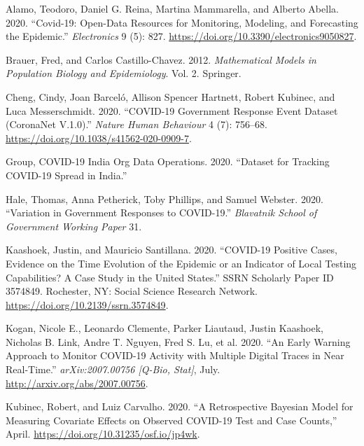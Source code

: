 \documentclass[10pt,letterpaper]{article}
\newlength{\cslhangindent}
\newenvironment{cslreferences}%
  {\setlength{\parindent}{0pt}%
  \everypar{\setlength{\hangindent}{\cslhangindent}}\ignorespaces}%
  {\par}
\begin{document}
\hypertarget{refs}{}
\begin{cslreferences}
\leavevmode\hypertarget{ref-alamoCovid19OpenDataResources2020}{}%
Alamo, Teodoro, Daniel G. Reina, Martina Mammarella, and Alberto Abella.
2020. ``Covid-19: Open-Data Resources for Monitoring, Modeling, and
Forecasting the Epidemic.'' \emph{Electronics} 9 (5): 827.
\url{https://doi.org/10.3390/electronics9050827}.

\leavevmode\hypertarget{ref-brauerMathematicalModelsPopulation2012}{}%
Brauer, Fred, and Carlos Castillo-Chavez. 2012. \emph{Mathematical
Models in Population Biology and Epidemiology}. Vol. 2. Springer.

\leavevmode\hypertarget{ref-chengCOVID19GovernmentResponse2020a}{}%
Cheng, Cindy, Joan Barceló, Allison Spencer Hartnett, Robert Kubinec,
and Luca Messerschmidt. 2020. ``COVID-19 Government Response Event
Dataset (CoronaNet V.1.0).'' \emph{Nature Human Behaviour} 4 (7):
756--68. \url{https://doi.org/10.1038/s41562-020-0909-7}.

\leavevmode\hypertarget{ref-covid19indiaorg2020tracker}{}%
Group, COVID-19 India Org Data Operations. 2020. ``Dataset for Tracking
COVID-19 Spread in India.''

\leavevmode\hypertarget{ref-haleVariationGovernmentResponses2020}{}%
Hale, Thomas, Anna Petherick, Toby Phillips, and Samuel Webster. 2020.
``Variation in Government Responses to COVID-19.'' \emph{Blavatnik
School of Government Working Paper} 31.

\leavevmode\hypertarget{ref-kaashoekCOVID19PositiveCases2020a}{}%
Kaashoek, Justin, and Mauricio Santillana. 2020. ``COVID-19 Positive
Cases, Evidence on the Time Evolution of the Epidemic or an Indicator of
Local Testing Capabilities? A Case Study in the United States.'' SSRN
Scholarly Paper ID 3574849. Rochester, NY: Social Science Research
Network. \url{https://doi.org/10.2139/ssrn.3574849}.

\leavevmode\hypertarget{ref-koganEarlyWarningApproach2020}{}%
Kogan, Nicole E., Leonardo Clemente, Parker Liautaud, Justin Kaashoek,
Nicholas B. Link, Andre T. Nguyen, Fred S. Lu, et al. 2020. ``An Early
Warning Approach to Monitor COVID-19 Activity with Multiple Digital
Traces in Near Real-Time.'' \emph{arXiv:2007.00756 {[}Q-Bio, Stat{]}},
July. \url{http://arxiv.org/abs/2007.00756}.

\leavevmode\hypertarget{ref-kubinecRetrospectiveBayesianModel2020}{}%
Kubinec, Robert, and Luiz Carvalho. 2020. ``A Retrospective Bayesian
Model for Measuring Covariate Effects on Observed COVID-19 Test and Case
Counts,'' April. \url{https://doi.org/10.31235/osf.io/jp4wk}.


\end{cslreferences}
\end{document}
